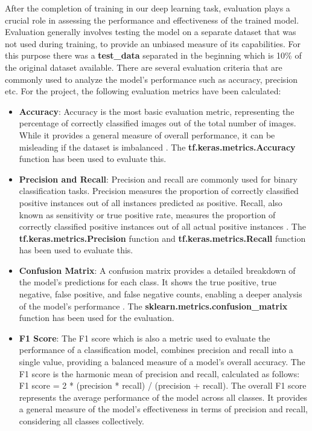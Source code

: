 After the completion of training in our deep learning task, evaluation plays a crucial role in assessing the performance and effectiveness of the trained model. Evaluation generally involves testing the model on a separate dataset that was not used during training, to provide an unbiased measure of its capabilities. For this purpose there was a \textbf{test\_data} separated in the beginning which is 10\% of the original dataset available. There are several evaluation criteria that are commonly used to analyze the model's performance such as accuracy, precision etc. For the project, the following evaluation metrics have been calculated:
\begin{itemize}
    \item \textbf{Accuracy}: Accuracy is the most basic evaluation metric, representing the percentage of correctly classified images out of the total number of images. While it provides a general measure of overall performance, it can be misleading if the dataset is imbalanced \cite{ni2019justifying}. The \textbf{tf.keras.metrics.Accuracy} function \cite{tensorflowTfkerasmetricsAccuracyTensorFlow} has been used to evaluate this.
    \item \textbf{Precision and Recall}: Precision and recall are commonly used for binary classification tasks. Precision measures the proportion of correctly classified positive instances out of all instances predicted as positive. Recall, also known as sensitivity or true positive rate, measures the proportion of correctly classified positive instances out of all actual positive instances \cite{ni2019justifying}. The \textbf{tf.keras.metrics.Precision} function \cite{tensorflowTfkerasmetricsPrecisionTensorFlow} and \textbf{tf.keras.metrics.Recall} function \cite{tensorflowTfkerasmetricsRecallTensorFlow} has been used to evaluate this.
    \item \textbf{Confusion Matrix}: A confusion matrix provides a detailed breakdown of the model's predictions for each class. It shows the true positive, true negative, false positive, and false negative counts, enabling a deeper analysis of the model's performance \cite{10.1145/3411764.3445673}. The \textbf{sklearn.metrics.confusion\_matrix} function \cite{sklearn.metrics.confusion_matrix} has been used for the evaluation. 
    \item \textbf{F1 Score}: The F1 score which is also a metric used to evaluate the performance of a classification model, combines precision and recall into a single value, providing a balanced measure of a model's overall accuracy. The F1 score is the harmonic mean of precision and recall, calculated as follows: F1 score = 2 * (precision * recall) / (precision + recall). The overall F1 score represents the average performance of the model across all classes. It provides a general measure of the model's effectiveness in terms of precision and recall, considering all classes collectively.

\end{itemize}

